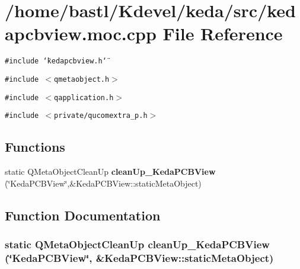 \section{/home/bastl/Kdevel/keda/src/kedapcbview.moc.cpp File Reference}
\label{kedapcbview_8moc_8cpp}
{\tt \#include \char`\"{}kedapcbview.h\char`\"{}}\par
{\tt \#include $<$qmetaobject.h$>$}\par
{\tt \#include $<$qapplication.h$>$}\par
{\tt \#include $<$private/qucomextra\_\-p.h$>$}\par
\subsection*{Functions}
\begin{CompactItemize}
\item 
static QMeta\-Object\-Clean\-Up {\bf clean\-Up\_\-Keda\-PCBView} (\char`\"{}Keda\-PCBView\char`\"{},\&Keda\-PCBView::static\-Meta\-Object)
\end{CompactItemize}


\subsection{Function Documentation}
\subsubsection{\setlength{\rightskip}{0pt plus 5cm}static QMeta\-Object\-Clean\-Up clean\-Up\_\-Keda\-PCBView (\char`\"{}Keda\-PCBView\char`\"{}, \&Keda\-PCBView::static\-Meta\-Object)\hspace{0.3cm}{\tt  [static]}}\label{kedapcbview_8moc_8cpp_28fc918b986d213a78aae8f4791848c7}


